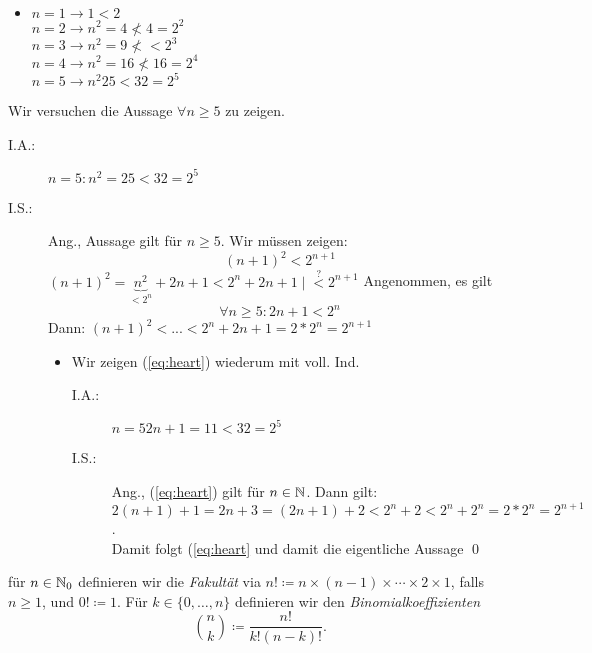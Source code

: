 \documentclass[consecutivenumbering]{gadsescript}
\begin{document}
\begin{example}
	\begin{itemize}
		\item $n = 1 \to 1 < 2$\\
			$ n = 2 \to n^2 = 4 \nless 4 = 2^2 $\\
			$ n = 3 \to n^2 = 9 \nless < 2^3 $\\
			$ n = 4 \to n^2 = 16 \nless 16 = 2^4 $\\
			$ n = 5 \to n^2 25 < 32 = 2^5 $\\
	\end{itemize}
	Wir versuchen die Aussage $ \forall n \geq 5 $ zu zeigen.\\
	\begin{description}
		\item[I.A.:] $ n = 5 : n^2 = 25 < 32 = 2^5 $
		\item[I.S.:] Ang., Aussage gilt für $ n \geq 5 $. Wir müssen zeigen:
			\[ ( n + 1 )^2 < 2^{n + 1} \]
			$ ( n + 1 ) ^2 = \underbrace{n^2}_{<2^n} + 2n + 1 < 2^n + 2n + 1 \mid \overset{?}{<} 2^{ n  + 1} $
			Angenommen, es gilt 
			\begin{equation}
				\label{eq:heart} \forall n \geq 5 : 2n + 1 < 2^n
			\end{equation}
			Dann: $ ( n + 1)^2 < ... < 2^n + 2n + 1 = 2 * 2^n = 2^{n+1} $
			\begin{itemize}
				\item Wir zeigen (\ref{eq:heart}) wiederum mit voll. Ind.
					\begin{description}
						\item[I.A.:] $ n = 5 2n + 1 = 11 < 32 = 2^5 $
						\item[I.S.:] Ang., (\ref{eq:heart}) gilt für $n \in \mathbb{N} $. Dann gilt:
							$ 2(n+1) + 1 = 2n + 3 = (2n + 1) + 2 < 2^n + 2 < 2^n + 2^n = 2*2^n = 2^{n+1} $.\\
							Damit folgt (\ref{eq:heart} und damit die eigentliche Aussage \qed
					\end{description}
			\end{itemize}
	\end{description}

\end{example}

\begin{definition}
	für $ n \in \mathbb{N}_0 $ definieren wir die \textit{Fakultät} via $n! \coloneqq n \times (n-1) \times \dotsb \times 2 \times 1 $, falls $n \geq 1 $, und $0! \coloneqq 1 $.
	Für $ k \in \{ 0, \dotsc, n\} $ definieren wir den \textit{Binomialkoeffizienten}
	\[ \binom{n}{k} \coloneqq \frac{ n!}{k!(n-k)!}.\]
\end{definition}
\end{document}
